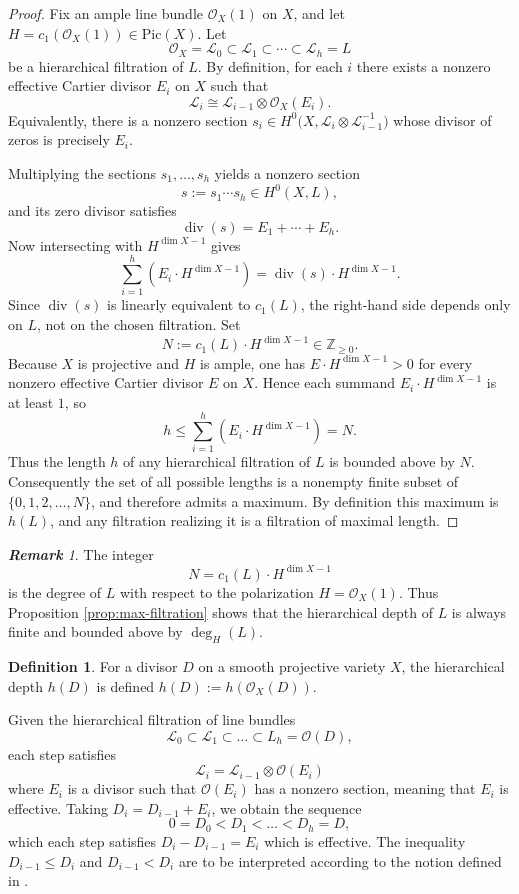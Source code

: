 \documentclass[14pt]{amsart}
\theoremstyle{plain}
\theoremstyle{definition}
\newtheorem{defn}[thm]{\bf Definition}
\theoremstyle{remark}
\newtheorem{rem}[thm]{\bf Remark}
\theoremstyle{example}
\def \L{\mathcal{L}}
\def \O{\mathcal{O}}
\def \Pic{\mathrm{Pic}}
\begin{document}
\begin{proof}
Fix an ample line bundle $\O_X(1)$ on $X$, and let $H=c_1(\O_X(1))\in \Pic(X)$. 
Let 
$$
\O_X=\L_0 \subset \L_1 \subset \cdots \subset \L_h=L
$$
be a hierarchical filtration of $L$. 
By definition, for each $i$ there exists a nonzero effective Cartier divisor $E_i$ on $X$ 
such that 
$$
\L_i \cong \L_{i-1}\otimes \O_X(E_i).
$$
Equivalently, there is a nonzero section 
$s_i \in H^0\!\big(X,\L_i\otimes\L_{i-1}^{-1}\big)$ 
whose divisor of zeros is precisely $E_i$. 

Multiplying the sections $s_1,\dots,s_h$ yields a nonzero section 
$$
s := s_1 \cdots s_h \in H^0(X,L),
$$
and its zero divisor satisfies
$$
\operatorname{div}(s) = E_1 + \cdots + E_h.
$$
Now intersecting with $H^{\dim X - 1}$ gives
$$
\sum_{i=1}^h (E_i \cdot H^{\dim X - 1})
= \operatorname{div}(s)\cdot H^{\dim X - 1}.
$$
Since $\operatorname{div}(s)$ is linearly equivalent to $c_1(L)$, the right-hand side depends
only on $L$, not on the chosen filtration. Set
$$
N := c_1(L)\cdot H^{\dim X - 1} \in \mathbb{Z}_{\ge 0}.
$$
Because $X$ is projective and $H$ is ample, one has 
$E\cdot H^{\dim X-1} > 0$ for every nonzero effective Cartier divisor $E$ on $X$. 
Hence each summand $E_i\cdot H^{\dim X-1}$ is at least $1$, so
$$
h \le \sum_{i=1}^h (E_i \cdot H^{\dim X - 1}) = N.
$$
Thus the length $h$ of any hierarchical filtration of $L$ is bounded above by $N$.
Consequently the set of all possible lengths is a nonempty finite subset of 
$\{0,1,2,\dots,N\}$, and therefore admits a maximum. 
By definition this maximum is $h(L)$, and any filtration realizing it is a 
filtration of maximal length.
\end{proof}

\begin{rem}
The integer 
$$
N = c_1(L)\cdot H^{\dim X - 1}
$$
is the degree of $L$ with respect to the polarization $H=\O_X(1)$. 
Thus Proposition \ref{prop:max-filtration} shows that the hierarchical depth of $L$
is always finite and bounded above by $\deg_H(L)$. 
\end{rem}

\begin{defn}
For a divisor $D$ on a smooth projective variety $X$, the hierarchical depth $h(D)$ is defined $h(D):=h(\O_X(D))$.
\end{defn}

Given the hierarchical filtration of line bundles
$$\L_0\subset\L_1\subset\ldots\subset L_h=\O(D),$$
each step satisfies
$$\L_i=\L_{i-1}\otimes\O(E_i)$$
where $E_i$ is a divisor such that $\O(E_i)$ has a nonzero section, meaning that $E_i$ is effective. Taking $D_i=D_{i-1}+E_i$, we obtain the sequence
$$0=D_0<D_1<\dots<D_h=D,$$
which each step satisfies $D_i-D_{i-1}=E_i$ which is effective. The inequality $D_{i-1}\leq D_i$ and $D_{i-1}< D_i$ are to be interpreted according to the notion defined in \cite{Ha}.
\end{document}
